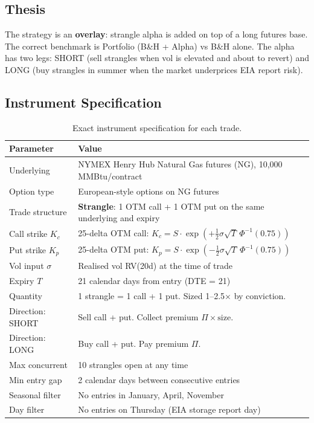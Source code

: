 \documentclass[11pt,a4paper]{article}
\begin{document}
\subsection{Thesis}

The strategy is an \textbf{overlay}: strangle alpha is added on top of a long futures base. The correct benchmark is Portfolio (B\&H + Alpha) vs B\&H alone. The alpha has two legs: SHORT (sell strangles when vol is elevated and about to revert) and LONG (buy strangles in summer when the market underprices EIA report risk).

\subsection{Instrument Specification}

\begin{table}[H]
\centering
\caption{Exact instrument specification for each trade.}
\begin{tabularx}{\textwidth}{lX}
\toprule
Parameter & Value \\
\midrule
Underlying & NYMEX Henry Hub Natural Gas futures (NG), 10,000 MMBtu/contract \\
Option type & European-style options on NG futures \\
Trade structure & \textbf{Strangle}: 1 OTM call + 1 OTM put on the same underlying and expiry \\
Call strike $K_c$ & 25-delta OTM call: $K_c = S \cdot \exp(+\tfrac{1}{2}\sigma\sqrt{T}\,\Phi^{-1}(0.75))$ \\
Put strike $K_p$ & 25-delta OTM put: $K_p = S \cdot \exp(-\tfrac{1}{2}\sigma\sqrt{T}\,\Phi^{-1}(0.75))$ \\
Vol input $\sigma$ & Realised vol RV(20d) at the time of trade \\
Expiry $T$ & 21 calendar days from entry (DTE = 21) \\
Quantity & 1 strangle = 1 call + 1 put. Sized 1--2.5$\times$ by conviction. \\
Direction: SHORT & Sell call + put. Collect premium $\Pi \times \text{size}$. \\
Direction: LONG & Buy call + put. Pay premium $\Pi$. \\
Max concurrent & 10 strangles open at any time \\
Min entry gap & 2 calendar days between consecutive entries \\
Seasonal filter & No entries in January, April, November \\
Day filter & No entries on Thursday (EIA storage report day) \\
\bottomrule
\end{tabularx}
\end{table}
\end{document}
